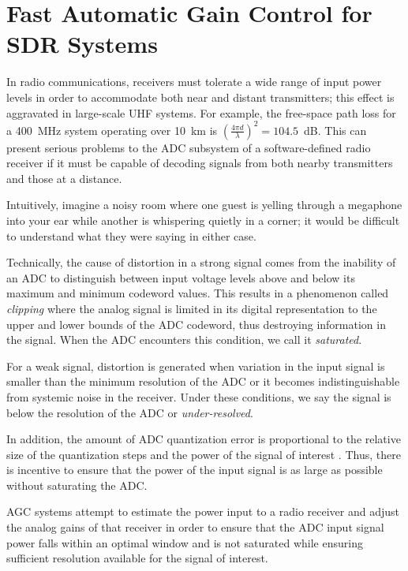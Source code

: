 \section{Fast Automatic Gain Control for SDR Systems}
\label{wurc_agc}

In radio communications, receivers must tolerate a wide range of input power levels in order to accommodate both near and distant transmitters; this effect is aggravated in large-scale UHF systems.
For example, the free-space path loss for a 400~MHz system operating over 10~km is $(\frac{4\pi d}{\lambda})^{2} = 104.5$~dB. This can present serious problems to the \ac{ADC} subsystem of a software-defined radio receiver if it must be capable of decoding signals from both nearby transmitters and those at a distance.

Intuitively, imagine a noisy room where one guest is yelling through a megaphone into your ear while another is whispering quietly in a corner; it would be difficult to understand what they were saying in either case.

Technically, the cause of distortion in a strong signal comes from the inability of an \ac{ADC} to distinguish between input voltage levels above and below its maximum and minimum codeword values.
This results in a phenomenon called \textit{clipping} where the analog signal is limited in its digital representation to the upper and lower bounds of the \ac{ADC} codeword, thus destroying information in the signal.
When the \ac{ADC} encounters this condition, we call it \textit{saturated}.

For a weak signal, distortion is generated when variation in the input signal is smaller than the minimum resolution of the \ac{ADC} or it becomes indistinguishable from systemic noise in the receiver.
Under these conditions, we say the signal is below the resolution of the \ac{ADC} or \textit{under-resolved}.

In addition, the amount of \ac{ADC} quantization error is proportional to the relative size of the quantization steps and the power of the signal of interest \cite{middleton2007agc}.
Thus, there is incentive to ensure that the power of the input signal is as large as possible without saturating the \ac{ADC}.

\ac{AGC} systems attempt to estimate the power input to a radio receiver and adjust the analog gains of that receiver in order to ensure that the \ac{ADC} input signal power falls within an optimal window and is not saturated while ensuring sufficient resolution available for the signal of interest.

